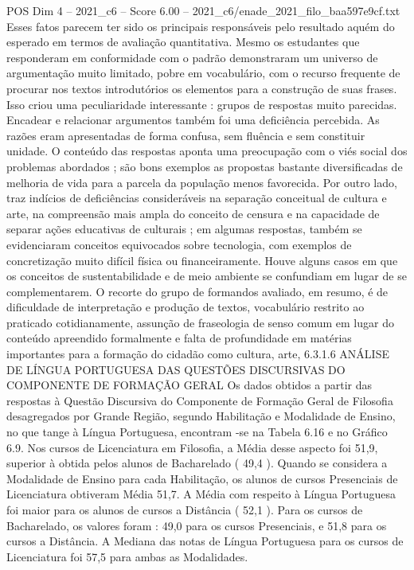 \begin{textsample}{POS Dim 4 – 2021\_c6 – Score 6.00 – 2021\_c6/enade\_2021\_filo\_baa597e9cf.txt}
Esses fatos parecem ter sido os principais responsáveis pelo resultado aquém do esperado em termos de avaliação quantitativa.
Mesmo os estudantes que responderam em conformidade com o padrão demonstraram um universo de argumentação muito limitado, pobre em vocabulário, com o recurso frequente de procurar nos textos introdutórios os elementos para a construção de suas frases.
Isso criou uma peculiaridade interessante : grupos de respostas muito parecidas.
Encadear e relacionar argumentos também foi uma deficiência percebida.
As razões eram apresentadas de forma confusa, sem fluência e sem constituir unidade.
O conteúdo das respostas aponta uma preocupação com o viés social dos problemas abordados ; são bons exemplos as propostas bastante diversificadas de melhoria de vida para a parcela da população menos favorecida.
Por outro lado, traz indícios de deficiências consideráveis na separação conceitual de cultura e arte, na compreensão mais ampla do conceito de censura e na capacidade de separar ações educativas de culturais ; em algumas respostas, também se evidenciaram conceitos equivocados sobre tecnologia, com exemplos de concretização muito difícil física ou financeiramente.
Houve alguns casos em que os conceitos de sustentabilidade e de meio ambiente se confundiam em lugar de se complementarem.
O recorte do grupo de formandos avaliado, em resumo, é de dificuldade de interpretação e produção de textos, vocabulário restrito ao praticado cotidianamente, assunção de fraseologia de senso comum em lugar do conteúdo apreendido formalmente e falta de profundidade em matérias importantes para a formação do cidadão como cultura, arte, 6.3.1.6 ANÁLISE DE LÍNGUA PORTUGUESA DAS QUESTÕES DISCURSIVAS DO COMPONENTE DE FORMAÇÃO GERAL Os dados obtidos a partir das respostas à Questão Discursiva do Componente de Formação Geral de Filosofia desagregados por Grande Região, segundo Habilitação e Modalidade de Ensino, no que tange à Língua Portuguesa, encontram -se na Tabela 6.16 e no Gráfico 6.9.
Nos cursos de Licenciatura em Filosofia, a Média desse aspecto foi 51,9, superior à obtida pelos alunos de Bacharelado ( 49,4 ).
Quando se considera a Modalidade de Ensino para cada Habilitação, os alunos de cursos Presenciais de Licenciatura obtiveram Média 51,7.
A Média com respeito à Língua Portuguesa foi maior para os alunos de cursos a Distância ( 52,1 ).
Para os cursos de Bacharelado, os valores foram : 49,0 para os cursos Presenciais, e 51,8 para os cursos a Distância.
A Mediana das notas de Língua Portuguesa para os cursos de Licenciatura foi 57,5 para ambas as Modalidades.

\end{textsample}
